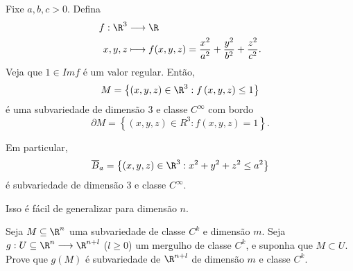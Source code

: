 \begin{eg}
    Fixe $a,b,c > 0$. Defina
    \begin{align*}
        f: \R^3 &\longrightarrow \R \\
        x,y,z &\longmapsto f(x,y,z) = \frac{x^2}{a^2} + \frac{y^2}{b^2} + \frac{z^2}{c^2}
    .\end{align*}
    Veja que $1 \in Im f$ é um valor regular. Então, \[
    M = \left\{ \left( x,y,z \right) \in \R^3 : f\left( x,y,z \right) \le 1 \right\} 
    \] é uma subvariedade de dimensão $3$ e classe $C^{\infty}$ com bordo \[
    \partial M = \left\{ \left( x,y,z \right) \in R^3 : f\left( x,y,z \right) = 1 \right\} 
    .\]

    Em particular, \[
    \overline{B}_a = \left\{ \left( x,y,z \right) \in \R^3 : x^2 + y^2 + z^2 \le a^2 \right\} 
    \] é subvariedade de dimensão 3 e classe $C^{\infty}$.

    Isso é fácil de generalizar para dimensão $n$.
\end{eg}

\begin{problem}
    Seja $M\subseteq \R^{n}$ uma subvariedade de classe $C^{k}$ e dimensão $m$. Seja $g: U\subseteq\R^{n} \longrightarrow \R^{n+l}$ ($l\ge 0$) um mergulho de classe $C^{k}$, e suponha que $M \subset U$. Prove que $g\left( M \right)$ é subvariedade de $\R^{n+l}$ de dimensão $m$ e classe $C^{k}$.
\end{problem}

